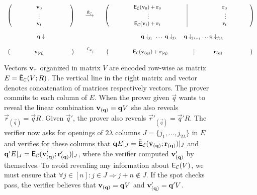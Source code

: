 \begin{figure}[!h]
\centering
\begin{minipage}[t]{15cm}
$$\begin{array}{ccc} 
\left(\begin{array}{ccc}\qquad &\quad\vect_0\quad \ &\ \qquad \\ &\quad \vdots\quad\ & \\ \qquad & \quad \vect_t \quad\ & \quad \end{array} \right) & \quad \overset{\ECC}{\longrightarrow} \quad & \left(\begin{array}{ccc|ccc} \qquad  & \quad \preECC(\vect_0)+\vec{r}_0 \quad \ & \qquad  &\qquad \qquad & \quad \vec{r}_0 \quad\ & \quad \\ 
&\vdots &&& \vdots & \\
\qquad  & \quad \preECC(\vect_t)+\vec{r}_t \quad \ & \qquad &\qquad \qquad & \quad \vec{r}_t \quad\ & \quad \ \\
\end{array}\right)\\
&\quad &\\
\vec{q}\downarrow && \quad\vec{q}\downarrow_{j_1} \,\,\dots\,\, \vec{q}\downarrow_{j_\lambda} \quad \vec{q}\downarrow_{j_{\lambda+1}} \dots \vec{q}\downarrow_{j_{2\lambda}}\\
&\quad & \\ 
\left(\begin{array}{ccc}\qquad &\quad \vect_{(\vec{q})} \quad \ & \ \qquad \end{array}\right) & \quad \overset{\ECC}{\longrightarrow} \quad & \left(\begin{array}{ccc|ccc} \qquad  & \quad \preECC(\vect_{(\vec{q})})+\vec{r}_{(\vec{q})} \quad\ & \qquad &\quad\, & \quad \vec{r}_{(\vec{q})} \quad\ & \qquad \ \end{array}\right)
\end{array}$$
\end{minipage}
\caption{Vectors ${\mathbf{v}}_\tau$ organized in matrix $V$ are encoded row-wise as matrix $E=\tilde{\mathsf{E}}_{\mathcal{C}}(V;R)$. The vertical line in the right matrix and vector denotes concatenation of matrices respectively vectors. The prover commits to each column of $E$. When the prover given $\vec{q}$ wants to reveal the linear combination ${\mathbf{v}}_{(\mathbf{q})}=\mathbf{q}V$ she also reveals $\vec{r}_{(\vec{q})}=\vec{q}R$. Given $\vec{q}'$, the prover also reveals $\vec{r}'_{(\vec{q})}=\vec{q}'R$. The verifier now asks for openings of $2\lambda$ columns $J=\{j_1,\dots,j_{2\lambda}\}$ in $E$ and verifies for these columns that $\mathbf{q}E|_J=\tilde{\mathsf{E}}_{\mathcal{C}}({\mathbf{v}}_{(\mathbf{q})};\mathbf{r}_{(\mathbf{q})})|_J$ and $\mathbf{q}'E|_J=\tilde{\mathsf{E}}_{\mathcal{C}}({\mathbf{v}}'_{(\mathbf{q})};\mathbf{r}'_{(\mathbf{q})})|_J$, where the verifier computed ${\mathbf{v}}'_{(\mathbf{q})}$ by themselves. To avoid revealing any information about $\mathsf{E}_{\mathcal{C}}(V)$, we must ensure that $\forall j\in [n]: j\in J\Rightarrow j+n\notin J$. If the spot checks pass, the verifier believes that ${\mathbf{v}}_{(\mathbf{q})}=\mathbf{q}V$ and ${\mathbf{v}}'_{(\mathbf{q})}=\mathbf{q}'V$.}\label{fig:spotcheck}
\end{figure}

